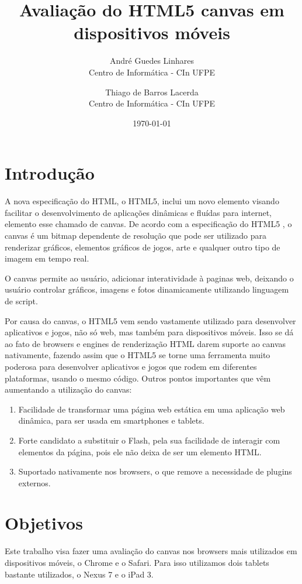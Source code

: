 \documentclass[11pt,a4paper]{article}
\title{Avaliação do HTML5 canvas em dispositivos móveis}
\author{
        André Guedes Linhares\\
        Centro de Informática - CIn UFPE\\
            \and
        Thiago de Barros Lacerda\\
        Centro de Informática - CIn UFPE\\
}
\date{\today}
\begin{document}
\maketitle

\section{Introdução}

A nova especificação do HTML, o HTML5, inclui um novo elemento visando facilitar o desenvolvimento de aplicações
dinâmicas e fluídas para internet, elemento esse chamado de canvas. De acordo com a especificação do HTML5
\cite{html5spec}, o canvas é um bitmap dependente de resolução que pode ser utilizado para renderizar gráficos,
elementos gráficos de jogos, arte e qualquer outro tipo de imagem em tempo real.

O canvas permite ao usuário, adicionar interatividade à paginas web, deixando o usuário controlar gráficos, imagens e
fotos dinamicamente utilizando linguagem de script.

Por causa do canvas, o HTML5 vem sendo vastamente utilizado para desenvolver aplicativos e jogos, não só web, mas também
para dispositivos móveis. Isso se dá ao fato de browsers e engines de renderização HTML darem suporte ao canvas
nativamente, fazendo assim que o HTML5 se torne uma ferramenta muito poderosa para desenvolver aplicativos e jogos que
rodem em diferentes plataformas, usando o mesmo código. Outros pontos importantes que vêm aumentando a utilização do
canvas:
\begin{enumerate}
    \item Facilidade de transformar uma página web estática em uma aplicação web dinâmica, para ser usada em smartphones
    e tablets.
    \item Forte candidato a substituir o Flash, pela sua facilidade de interagir com elementos da página, pois ele não
    deixa de ser um elemento HTML.
    \item Suportado nativamente nos browsers, o que remove a necessidade de plugins externos.
\end{enumerate}


\section{Objetivos}

Este trabalho visa fazer uma avaliação do canvas nos browsers mais utilizados em dispositivos móveis, o Chrome e o
Safari. Para isso utilizamos dois tablets bastante utilizados, o Nexus 7 e o iPad 3.
\end{document}
